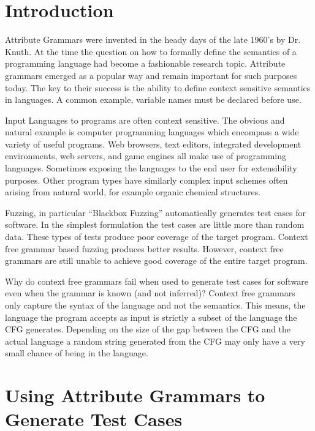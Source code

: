 \documentclass[12pt]{article}
\begin{document}
\begin{multicols}{2}

\section{Introduction}

Attribute Grammars were invented in the heady days of the late 1960's by Dr.
Knuth.\cite{Knuth1990} At the time the question on how to formally define the
semantics of a programming language had become a fashionable research topic.
Attribute grammars emerged as a popular way and remain important for such
purposes today. The key to their success is the ability to define context
sensitive semantics in languages. A common example, variable names must be
declared before use.

Input Languages to programs are often context sensitive. The obvious and natural
example is computer programming languages which encompass a wide variety of
useful programs. Web browsers, text editors, integrated development environments,
web servers, and game engines all make use of programming languages. Sometimes
exposing the languages to the end user for extensibility purposes. Other program
types have similarly complex input schemes often arising from natural world,
for example organic chemical structures.

Fuzzing, in particular ``Blackbox Fuzzing'' automatically generates test cases
for software. In the simplest formulation the test cases are little more than
random data. These types of tests produce poor coverage of the target program.
Context free grammar based fuzzing produces better results. However, context
free grammars are still unable to achieve good coverage of the entire target
program. 

Why do context free grammars fail when used to generate test cases for software
even when the grammar is known (and not inferred)? Context free grammars only
capture the syntax of the language and not the semantics. This means, the
language the program accepts as input is strictly a subset of the language the
CFG generates. Depending on the size of the gap between the CFG and the actual
language a random string generated from the CFG may only have a very small
chance of being in the language.

\section{Using Attribute Grammars to Generate Test Cases}


\end{multicols}
\end{document}
